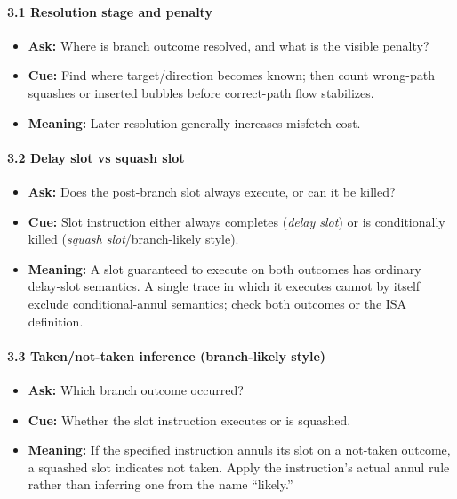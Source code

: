 \paragraph{3.1 Resolution stage and penalty}\label{par:auto-035}
\begin{itemize}
    \item \textbf{Ask:} Where is branch outcome resolved, and what is the visible penalty?
    \item \textbf{Cue:} Find where target/direction becomes known; then count wrong-path squashes or inserted bubbles before correct-path flow stabilizes.
    \item \textbf{Meaning:} Later resolution generally increases misfetch cost.
\end{itemize}

\paragraph{3.2 Delay slot vs squash slot}\label{par:auto-036}
\begin{itemize}
    \item \textbf{Ask:} Does the post-branch slot always execute, or can it be killed?
    \item \textbf{Cue:} Slot instruction either always completes (\textit{delay slot}) or is conditionally killed (\textit{squash slot}/branch-likely style).
    \item \textbf{Meaning:} A slot guaranteed to execute on both outcomes has ordinary delay-slot semantics.
    A single trace in which it executes cannot by itself exclude conditional-annul semantics; check both outcomes or the ISA definition.
\end{itemize}

\paragraph{3.3 Taken/not-taken inference (branch-likely style)}\label{par:auto-037}
\begin{itemize}
    \item \textbf{Ask:} Which branch outcome occurred?
    \item \textbf{Cue:} Whether the slot instruction executes or is squashed.
    \item \textbf{Meaning:} If the specified instruction annuls its slot on a not-taken outcome, a squashed slot indicates not taken.
    Apply the instruction's actual annul rule rather than inferring one from the name ``likely.''
\end{itemize}

